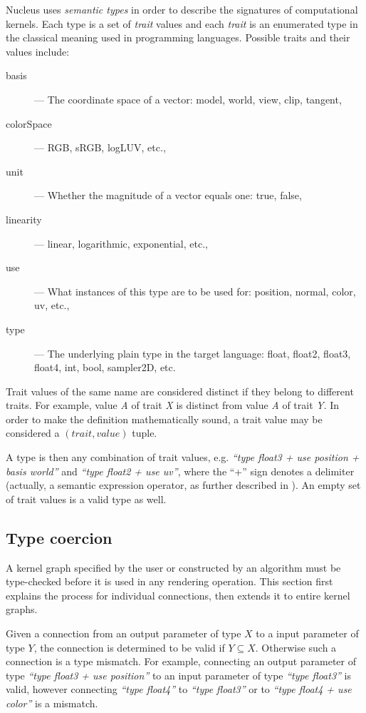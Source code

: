 Nucleus uses \emph{semantic types} in order to describe the signatures of computational kernels. Each type is a set of \emph{trait} values and each \emph{trait} is an enumerated type in the classical meaning used in programming languages. Possible traits and their values include:
\begin{description}
\item[basis] --- The coordinate space of a vector: model, world, view, clip, tangent,
\item[colorSpace] --- RGB, sRGB, logLUV, etc.,
\item[unit] --- Whether the magnitude of a vector equals one: true, false,
\item[linearity] --- linear, logarithmic, exponential, etc.,
\item[use] --- What instances of this type are to be used for: position, normal, color, uv, etc.,
\item[type] --- The underlying plain type in the target language: float, float2, float3, float4, int, bool, sampler2D, etc.
\end{description}

Trait values of the same name are considered distinct if they belong to different traits. For example, value \emph{A} of trait \emph{X} is distinct from value \emph{A} of trait \emph{Y}. In order to make the definition mathematically sound, a trait value may be considered a $(trait, value)$ tuple.

A type is then any combination of trait values, e.g. \emph{``type float3 + use position + basis world''} and \emph{``type float2 + use uv''}, where the ``+'' sign denotes a delimiter (actually, a semantic expression operator, as further described in ). An empty set of trait values is a valid type as well.

\subsection{Type coercion}
\label{sec:TypeCoercion}

A kernel graph specified by the user or constructed by an algorithm must be type-checked before it is used in any rendering operation. This section first explains the process for individual connections, then extends it to entire kernel graphs.

Given a connection from an output parameter of type $X$ to a input parameter of type $Y$, the connection is determined to be valid if $Y \subseteq X$. Otherwise such a connection is a type mismatch. For example, connecting an output parameter of type \emph{``type float3 + use position''} to an input parameter of type \emph{``type float3''} is valid, however connecting \emph{``type float4''} to \emph{``type float3''} or to \emph{``type float4 + use color''} is a mismatch.

